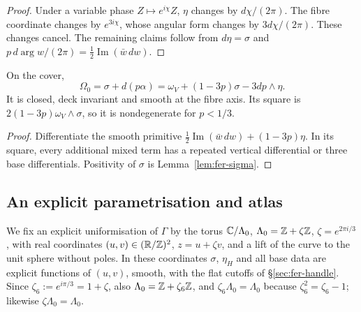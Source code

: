 \begin{proof}
Under a variable phase $Z\mapsto e^{i\chi}Z$, $\eta$ changes by $d\chi/(2\pi)$.
The fibre coordinate changes by $e^{3i\chi}$, whose angular form changes by $3d\chi/(2\pi)$.
These changes cancel. The remaining claims follow from $d\eta=\sigma$ and
$p\,d\arg w/(2\pi)=\frac12\operatorname{Im}(\bar w\,dw)$.
\end{proof}

\begin{lemma}\label{lem:fer-Omega0}
On the cover,
\begin{equation}\label{eq:fer-Omega0-local}
 \Omega_0=\sigma+d(p\alpha)
 =\omega_V+(1-3p)\sigma-3dp\wedge\eta.
\end{equation}
It is closed, deck invariant and smooth at the fibre axis. Its square is
$2(1-3p)\omega_V\wedge\sigma$, so it is nondegenerate for $p<1/3$.
\end{lemma}

\begin{proof}
Differentiate the smooth primitive
$\frac12\operatorname{Im}(\bar w\,dw)+(1-3p)\eta$.
In its square, every additional mixed term has a repeated vertical differential or three base differentials.
Positivity of $\sigma$ is Lemma~\ref{lem:fer-sigma}.
\end{proof}

\subsection{An explicit parametrisation and atlas}\label{sec:fer-torus}

We fix an explicit uniformisation of $\Gamma$ by the torus $\mathbb{C}/\Lambda_0$, $\Lambda_0=\mathbb{Z}+\zeta\mathbb{Z}$,
$\zeta=e^{2\pi i/3}$, with real coordinates $(u,v)\in(\mathbb{R}/\mathbb{Z})^2$, $z=u+\zeta v$, and a lift of the curve to the unit sphere
without poles. In these coordinates $\sigma$, $\eta_H$ and all base data are explicit functions of $(u,v)$, smooth, with the flat cutoffs of \S\ref{sec:fer-handle}. Since $\zeta_6:=e^{i\pi/3}=1+\zeta$, also $\Lambda_0=\mathbb{Z}+\zeta_6\mathbb{Z}$, and
$\zeta_6\Lambda_0=\Lambda_0$ because $\zeta_6^2=\zeta_6-1$; likewise $\zeta\Lambda_0=\Lambda_0$.

